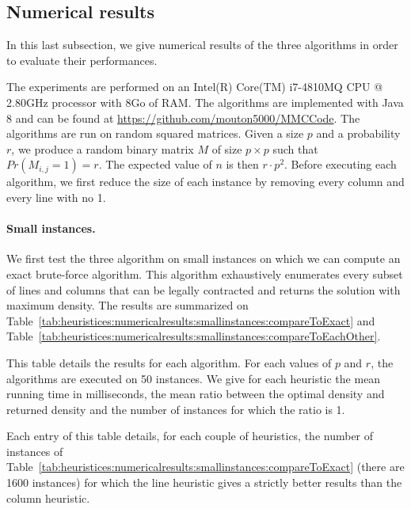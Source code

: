 \subsection{Numerical results}

In this last subsection, we give numerical results of the three algorithms in order to evaluate their performances.

The experiments are performed on an Intel(R) Core(TM) i7-4810MQ CPU @ 2.80GHz processor with 8Go of RAM. The algorithms are implemented with Java 8 and can be found at \url{https://github.com/mouton5000/MMCCode}. The algorithms are run on random squared matrices. Given a size $p$ and a probability $r$, we produce a random binary matrix $M$ of size $p \times p$ such that $Pr(M_{i,j} = 1) = r$. The expected value of $n$ is then $r \cdot p^2$. Before executing each algorithm, we first reduce the size of each instance by removing every column and every line with no 1.

\paragraph{Small instances. }
We first test the three algorithm on small instances on which we can compute an exact brute-force algorithm. This algorithm exhaustively enumerates every subset of lines and columns that can be legally contracted and returns the solution with maximum density. The results are summarized on Table~\ref{tab:heuristices:numericalresults:smallinstances:compareToExact} and  Table~\ref{tab:heuristices:numericalresults:smallinstances:compareToEachOther}.


\begin{table}[ht!]
	\centering
	\def\arraystretch{1.2}
	\setlength\tabcolsep{0.075cm}
	
	\caption{This table details the results for each algorithm. For each values of $p$ and $r$, the algorithms are executed on 50 instances. We give for each heuristic the mean running time in milliseconds, the mean ratio between the optimal density and returned density and the number of instances for which the ratio is 1.}
	\label{tab:heuristices:numericalresults:smallinstances:compareToExact}
\end{table}

\begin{table}[ht!]
	\centering
	\def\arraystretch{1.2}
	\setlength\tabcolsep{0.075cm}
	
	\caption{Each entry of this table details, for each couple of heuristics, the number of instances of Table~\ref{tab:heuristices:numericalresults:smallinstances:compareToExact} (there are 1600 instances) for which the line heuristic gives a strictly better results than the column heuristic. }
	\label{tab:heuristices:numericalresults:smallinstances:compareToEachOther}
\end{table}


